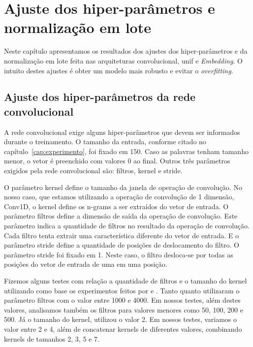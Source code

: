 \chapter{Ajuste dos hiper-parâmetros e normalização em lote}
\label{ape:ajuste-hiper-parametros-cnn}

Neste capítulo apresentamos os resultados dos ajustes dos hiper-parâmetros e da normalização em lote feita nas arquiteturas convolucional, \Gls{unif} e \textit{Embedding}. O intuito destes ajustes é obter um modelo mais robusto e evitar o \textit{overfitting}.

\section{Ajuste dos hiper-parâmetros da rede convolucional}
\label{sec:ajuste-hiper-parametros-cnn}

A rede convolucional exige alguns hiper-parâmetros que devem ser informados durante o treinamento. O tamanho da entrada, conforme citado no capítulo~\ref{cap:experimento}, foi fixado em 150. Caso as palavras tenham tamanho menor, o vetor é preenchido com valores $0$ ao final. Outros três parâmetros exigidos pela rede convolucional são: filtros, kernel e stride.

O parâmetro kernel define o tamanho da janela de operação de convolução. No nosso caso, que estamos utilizando a operação de convolução de 1 dimensão, Conv1D, o kernel define os n-grams a ser extraídos do vetor de entrada. 
O parâmetro filtros define a dimensão de saída da operação de convolução. Este parâmetro indica a quantidade de filtros no resultado da operação de convolução. Cada filtro tenta extrair uma característica diferente do vetor de entrada. E o parâmetro stride define a quantidade de posições de deslocamento do filtro. O parâmetro stride foi fixado em 1. Neste caso, o filtro desloca-se por todas as posições do vetor de entrada de uma em uma posição.

Fizemos alguns testes com relação a quantidade de filtros e o tamanho do kernel utilizando como base os experimentos feitos por \cite{feng-2015} e \cite{tan-lstm-qa}. Tanto \cite{feng-2015} quanto \cite{tan-lstm-qa} utilizaram o parâmetro filtros com o valor entre 1000 e 4000. Em nossos testes, além destes valores, analisamos também os filtros para valores menores como 50, 100, 200 e 500. Já o tamanho do kernel, \cite{tan-lstm-qa} utilizou o valor 2. Em nossos testes, variamos o valor entre 2 e 4, além de concatenar kernels de diferentes valores, combinando kernels de tamanhos 2, 3, 5 e 7.

